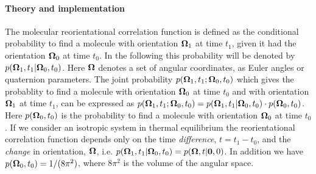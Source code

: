 \documentclass[a4paper,11pt]{report}
\begin{document}
\paragraph{Theory and implementation\\}
\label{rcf_theory}
The molecular reorientational correlation function is defined as the conditional probability to find a molecule with 
orientation ${\bf\Omega}_1$ at time $t_1$, given it had the orientation ${\bf\Omega}_0$ at time $t_0$.  In the following 
this probability will be denoted by $p({\bf\Omega}_1,t_1|{\bf\Omega}_0,t_0)$.  Here ${\bf\Omega}$ denotes a set of angular 
coordinates, as Euler angles or quaternion parameters. The joint probability $p({\bf\Omega}_1,t_1;{\bf\Omega}_0,t_0)$ which 
gives the probablity to find a molecule with orientation ${\bf\Omega}_0$ at time $t_0$ and with orientation ${\bf\Omega}_1$ 
at time $t_1$, can be expressed as 
$p({\bf\Omega}_1,t_1;{\bf\Omega}_0,t_0) = p({\bf\Omega}_1,t_1|{\bf\Omega}_0,t_0)\cdot p({\bf\Omega}_0,t_0)$.
Here $p({\bf\Omega}_0,t_0)$ is the probability to find a molecule with orientation ${\bf\Omega}_0$ at time $t_0$. If we 
consider an isotropic system in thermal equilibrium the reorientational correlation function depends only on the time 
{\em difference}, $t = t_1-t_0$, and the {\em change} in orientation, ${\bf\Omega}$, i.e. 
$p({\bf\Omega}_1,t_1|{\bf\Omega}_0,t_0) = p({\bf\Omega},t|{\bf 0},0)$. In addition we have 
$p({\bf\Omega}_0,t_0) = 1/(8\pi^2)$, where $8\pi^2$ is the volume of the angular space.
\end{document}

